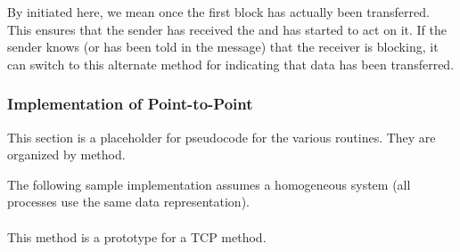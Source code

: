 By initiated here, we mean once the first block has actually been
transferred.  This ensures that the sender has received the
 and has started to act on it.  If the sender
knows (or has been told in the  message) that
the receiver is blocking, it can switch to this alternate method for
indicating that data has been transferred.

\clearpage

\subsubsection{Implementation of Point-to-Point}
\label{sec:pt2pt-implementation}
This section is a placeholder for pseudocode for the various routines.  They
are organized by method.

The following sample implementation assumes a homogeneous system (all
processes use the same data representation).  

\paragraph{\tcpname}
This method is a prototype for a TCP method.  

